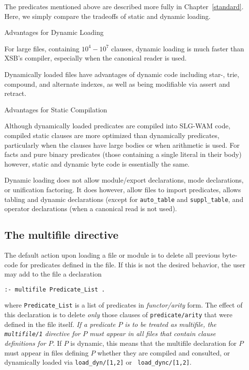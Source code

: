 The predicates mentioned above are described more fully in
Chapter~\ref{standard}.  Here, we simply compare the tradeoffs of
static and dynamic loading.
\bi
\item Advantages for Dynamic Loading
\bi
\item For large files, containing $10^4-10^7$ clauses, dynamic loading
  is much faster than XSB's compiler, especially when the canonical
  reader is used.
%
\item Dynamically loaded files have advantages of dynamic code
  including star-, trie, compound, and alternate indexes, as well as
  being modifiable via assert and retract.
\ei
\item Advantages for Static Compilation
\bi
\item Although dynamically loaded predicates are compiled into SLG-WAM
  code, compiled static clauses are more optimized than dynamically
  predicates, particularly when the clauses have large bodies or when
  arithmetic is used.  For facts and pure binary predicates (those
  containing a single literal in their body) however, static and
  dynamic byte code is essentially the same.
%
\item Dynamic loading does not allow module/export declarations, mode
  declarations, or unification factoring.  It does however, allow
  files to import predicates, allows tabling and dynamic declarations (except for
  {\tt auto\_table} and {\tt suppl\_table}, and operator declarations
  (when a canonical read is not used).
\ei 
\ei

\subsection{The multifile directive}
The default action upon loading a file or module is to delete all
previous byte-code for predicates defined in the file.  If this is not
the desired behavior, the user may add to the file a declaration
\begin{center}
{\tt :- multifile Predicate\_List .} \\
\end{center}
where {\tt Predicate\_List} is a list of predicates in {\em
  functor/arity\/} form.  The effect of this declaration is to delete
{\em only\/} those clauses of {\tt predicate/arity} that were defined
in the file itself.  {\em If a predicate $P$ is to be treated as
  multifile, the {\tt multifile/1} directive for $P$ must appear in
  all files that contain clause definitions for $P$.}  If $P$ is
dynamic, this means that the multifile declaration for $P$ must appear
in files defining $P$ whether they are compiled and consulted, or
dynamically loaded via {\tt load\_dyn/[1,2]} or {\tt
  load\_dync/[1,2]}.

